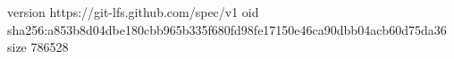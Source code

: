 version https://git-lfs.github.com/spec/v1
oid sha256:a853b8d04dbe180cbb965b335f680fd98fe17150e46ca90dbb04acb60d75da36
size 786528
